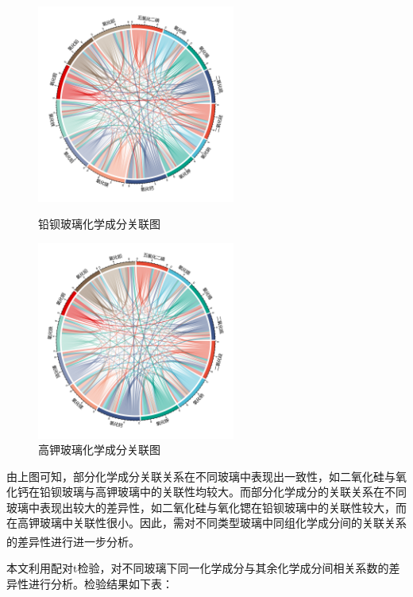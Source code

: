 \documentclass[withoutpreface,bwprint]{cumcmthesis} %
\begin{document}
\begin{figure}[H]
  \centering
  \begin{minipage}[t]{0.48\textwidth}
    \centering
    \includegraphics[width=6.5cm]{figure/铅弦图}
    \caption{铅钡玻璃化学成分关联图}
    \label{xiantu}
  \end{minipage}
  \begin{minipage}[t]{0.48\textwidth}
    \centering
    \includegraphics[width=6.5cm]{figure/钾弦图}
    \caption{高钾玻璃化学成分关联图}
    \label{xt}
  \end{minipage}
\end{figure}

由上图可知，部分化学成分关联关系在不同玻璃中表现出一致性，如二氧化硅与氧化钙在铅钡玻璃与高钾玻璃中的关联性均较大。而部分化学成分的关联关系在不同玻璃中表现出较大的差异性，如二氧化硅与氧化锶在铅钡玻璃中的关联性较大，而在高钾玻璃中关联性很小。因此，需对不同类型玻璃中同组化学成分间的关联关系的差异性进行进一步分析\textsuperscript{\cite{ref11}}。

本文利用配对t检验，对不同玻璃下同一化学成分与其余化学成分间相关系数的差异性进行分析。检验结果如下表：
\end{document}
